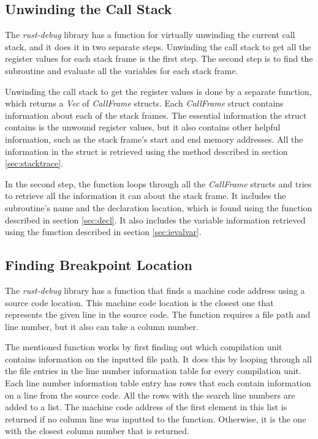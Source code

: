 \subsection{Unwinding the Call Stack}
The \emph{rust-debug} library has a function for virtually unwinding the current call stack, and it does it in two separate steps.
Unwinding the call stack to get all the register values for each stack frame is the first step.
The second step is to find the subroutine and evaluate all the variables for each stack frame.


Unwinding the call stack to get the register values is done by a separate function, which returns a \emph{Vec} of \emph{CallFrame} structs.
Each \emph{CallFrame} struct contains information about each of the stack frames.
The essential information the struct contains is the unwound register values, but it also contains other helpful information, such as the stack frame's start and end memory addresses.
All the information in the struct is retrieved using the method described in section \ref{sec:stacktrace}.


In the second step, the function loops through all the \emph{CallFrame} structs and tries to retrieve all the information it can about the stack frame.
It includes the subroutine's name and the declaration location, which is found using the function described in section \ref{sec:decl}.
It also includes the variable information retrieved using the function described in section \ref{sec:ievalvar}.



\subsection{Finding Breakpoint Location}
The \emph{rust-debug} library has a function that finds a machine code address using a source code location.
This machine code location is the closest one that represents the given line in the source code.
The function requires a file path and line number, but it also can take a column number.


The mentioned function works by first finding out which compilation unit contains information on the inputted file path.
It does this by looping through all the file entries in the line number information table for every compilation unit.
Each line number information table entry has rows that each contain information on a line from the source code.
All the rows with the search line numbers are added to a list.
The machine code address of the first element in this list is returned if no column line was inputted to the function.
Otherwise, it is the one with the closest column number that is returned.




